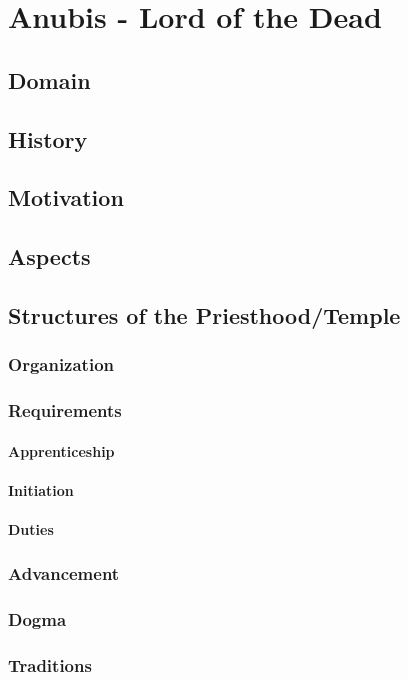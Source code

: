 \chapter{Anubis - Lord of the Dead}
\label{ch:divine-anubis}
\section{Domain}
\section{History}
\section{Motivation}
\section{Aspects}
\section{Structures of the Priesthood/Temple}
\subsection{Organization}
\subsection{Requirements}
\subsubsection{Apprenticeship}
\subsubsection{Initiation}
\subsubsection{Duties}
\subsection{Advancement}
\subsection{Dogma}
\subsection{Traditions}
